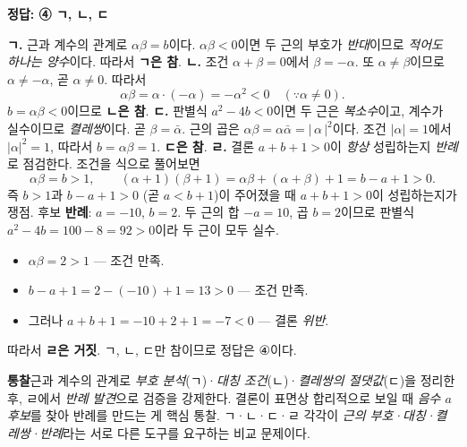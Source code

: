 \documentclass[10pt]{article}
\newcommand{\solnote}[1]{\par\smallskip\noindent
  \begin{tcolorbox}[enhanced, breakable, colback=vB-light, colframe=vB-light,
    boxrule=0pt, arc=3pt, left=10pt, right=10pt, top=4pt, bottom=4pt,
    fontupper=\sffamily\footnotesize\color{vB-ink}]
    \textbf{\color{vB-deep}통찰}\quad #1
  \end{tcolorbox}}
\begin{document}
\begin{answerbox}\sffamily\bfseries 정답: ④ ㄱ, ㄴ, ㄷ\end{answerbox}
 \textbf{ㄱ.} 근과 계수의 관계로 $\alpha\beta = b$이다. $\alpha\beta < 0$이면 두 근의 부호가 \emph{반대}이므로 \emph{적어도 하나는 양수}이다. 따라서 \textbf{ㄱ은 참}.
 \textbf{ㄴ.} 조건 $\alpha + \beta = 0$에서 $\beta = -\alpha$. 또 $\alpha \ne \beta$이므로 $\alpha \ne -\alpha$, 곧 $\alpha \ne 0$. 따라서
\[ \alpha\beta = \alpha \cdot (-\alpha) = -\alpha^2 < 0 \quad (\because \alpha \ne 0). \]
$b = \alpha\beta < 0$이므로 \textbf{ㄴ은 참}.
 \textbf{ㄷ.} 판별식 $a^2 - 4b < 0$이면 두 근은 \emph{복소수}이고, 계수가 실수이므로 \emph{켤레쌍}이다. 곧 $\beta = \bar{\alpha}$.
 근의 곱은 $\alpha\beta = \alpha\bar{\alpha} = |\,\alpha\,|^2$이다. 조건 $|\alpha| = 1$에서 $|\alpha|^2 = 1$, 따라서 $b = \alpha\beta = 1$. \textbf{ㄷ은 참}.
 \textbf{ㄹ.} 결론 $a + b + 1 > 0$이 \emph{항상} 성립하는지 \emph{반례}로 점검한다. 조건을 식으로 풀어보면
\[ \alpha\beta = b > 1, \qquad (\alpha + 1)(\beta + 1) = \alpha\beta + (\alpha + \beta) + 1 = b - a + 1 > 0. \]
즉 $b > 1$과 $b - a + 1 > 0$ (곧 $a < b + 1$)이 주어졌을 때 $a + b + 1 > 0$이 성립하는지가 쟁점.
 후보 \textbf{반례}: $a = -10$, $b = 2$. 두 근의 합 $-a = 10$, 곱 $b = 2$이므로 판별식 $a^2 - 4b = 100 - 8 = 92 > 0$이라 두 근이 모두 실수.
\begin{itemize}\setlength{\itemsep}{0pt}
\item $\alpha\beta = 2 > 1$ — 조건 만족.
\item $b - a + 1 = 2 - (-10) + 1 = 13 > 0$ — 조건 만족.
\item 그러나 $a + b + 1 = -10 + 2 + 1 = -7 < 0$ — 결론 \emph{위반}.
\end{itemize}
따라서 \textbf{ㄹ은 거짓}.
 ㄱ, ㄴ, ㄷ만 참이므로 정답은 $\textbf{④}$이다.
\solnote{근과 계수의 관계로 \emph{부호 분석}(ㄱ)·\emph{대칭 조건}(ㄴ)·\emph{켤레쌍의 절댓값}(ㄷ)을 정리한 후, ㄹ에서 \emph{반례 발견}으로 검증을 강제한다. 결론이 표면상 합리적으로 보일 때 \emph{음수 $a$ 후보}를 찾아 반례를 만드는 게 핵심 통찰. ㄱ·ㄴ·ㄷ·ㄹ 각각이 \emph{근의 부호·대칭·켤레쌍·반례}라는 서로 다른 도구를 요구하는 비교 문제이다.}

\end{document}
